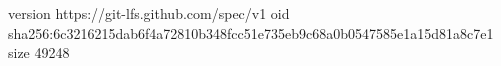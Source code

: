 version https://git-lfs.github.com/spec/v1
oid sha256:6c3216215dab6f4a72810b348fcc51e735eb9c68a0b0547585e1a15d81a8c7e1
size 49248
